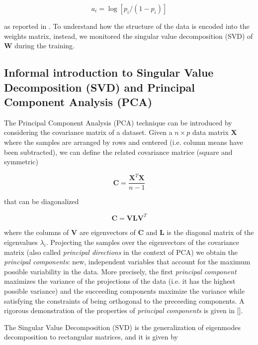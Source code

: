 \documentclass{revtex4-1}
\begin{document}
\begin{equation}
a_i = \log[p_i/(1-p_i)]
\label{eq:bias_init}
\end{equation}

as reported in \cite{Hinton_guide}. To understand how the structure of the data is encoded into the weights matrix, instead, we monitored the singular value decomposition (SVD) of \(\mathbf{W}\) during the training.

\subsection{Informal introduction to Singular Value Decomposition (SVD) and Principal Component Analysis (PCA)}

The Principal Component Analysis (PCA) technique can be introduced by considering the covariance matrix of a dataset. Given a \(n \times p\) data matrix \(\mathbf{X}\) where the samples are arranged by rows and centered (i.e. column means have been subtracted), we can define the related covariance matrice (square and symmetric)

\begin{equation}
\mathbf{C} = \frac{\mathbf{X}^T \mathbf{X}}{n-1}
\end{equation}

that can be diagonalized

\begin{equation}
\mathbf{C} = \mathbf{V L V}^T
\end{equation}

where the columns of \(\mathbf{V}\) are eigenvectors of \(\mathbf{C}\) and \(\mathbf{L}\) is the diagonal matrix of the eigenvalues \(\lambda_i\). Projecting the samples over the eigenvectors of the covariance matrix (also called \textit{principal directions} in the context of PCA) we obtain the \textit{principal components}: new, independent variables that account for the maximum possible variability in the data. More precisely, the first \textit{principal component} maximizes the variance of the projections of the data (i.e. it has the highest possible variance) and the succeeding components maximize the variance while satisfying the constraints of being orthogonal to the preceeding components. A rigorous demonstration of the properties of \textit{principal components} is given in [].

The Singular Value Decomposition (SVD) is the generalization of eigenmodes decomposition to rectangular matrices, and it is given by
\end{document}
